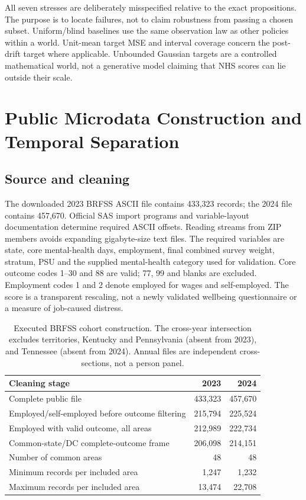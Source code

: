 All seven stresses are deliberately misspecified relative to the exact propositions. The purpose is to locate failures, not to claim robustness from passing a chosen subset. Uniform/blind baselines use the same observation law as other policies within a world. Unit-mean target MSE and interval coverage concern the post-drift target where applicable. Unbounded Gaussian targets are a controlled mathematical world, not a generative model claiming that NHS scores can lie outside their scale.

\section{Public Microdata Construction and Temporal Separation}
\subsection{Source and cleaning}
The downloaded 2023 BRFSS ASCII file contains 433,323 records; the 2024 file contains 457,670. Official SAS import programs and variable-layout documentation determine required ASCII offsets. Reading streams from ZIP members avoids expanding gigabyte-size text files. The required variables are state, core mental-health days, employment, final combined survey weight, stratum, PSU and the supplied mental-health category used for validation. Core outcome codes 1--30 and 88 are valid; 77, 99 and blanks are excluded. Employment codes 1 and 2 denote employed for wages and self-employed. The score is a transparent rescaling, not a newly validated wellbeing questionnaire or a measure of job-caused distress.

\begin{table}[htbp]
\centering
\begin{tabular}{lrr}\toprule
Cleaning stage & 2023 & 2024\\\midrule
Complete public file & 433,323 & 457,670\\
Employed/self-employed before outcome filtering & 215,794 & 225,524\\
Employed with valid outcome, all areas & 212,989 & 222,734\\
Common-state/DC complete-outcome frame & 206,098 & 214,151\\
Number of common areas & 48 & 48\\
Minimum records per included area & 1,247 & 1,232\\
Maximum records per included area & 13,474 & 22,708\\\bottomrule
\end{tabular}
\caption{Executed BRFSS cohort construction. The cross-year intersection excludes territories, Kentucky and Pennsylvania (absent from 2023), and Tennessee (absent from 2024). Annual files are independent cross-sections, not a person panel.}
\end{table}

